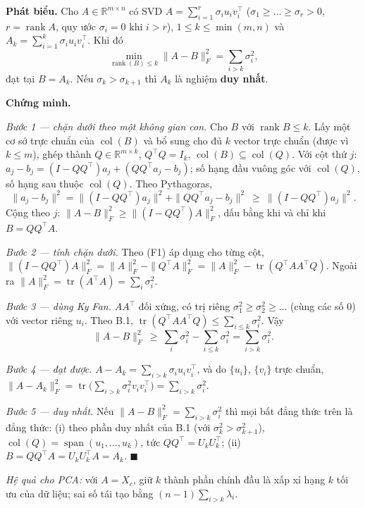 \textbf{Phát biểu.} Cho \(A\in\mathbb R^{m\times n}\) có SVD \(A=\sum_{i=1}^{r}\sigma_iu_iv_i^\top\) (\(\sigma_1\ge\dots\ge\sigma_r>0\), \(r=\operatorname{rank}A\), quy ước \(\sigma_i=0\) khi \(i>r\)), \(1\le k\le\min(m,n)\) và \(A_k=\sum_{i=1}^k\sigma_iu_iv_i^\top\). Khi đó \[\min_{\operatorname{rank}(B)\le k}\|A-B\|_F^2=\sum_{i>k}\sigma_i^2,\] đạt tại \(B=A_k\). Nếu \(\sigma_k>\sigma_{k+1}\) thì \(A_k\) là nghiệm \textbf{duy nhất}.

\textbf{Chứng minh.}

\emph{Bước 1 --- chặn dưới theo một không gian con.} Cho \(B\) với \(\operatorname{rank}B\le k\). Lấy một cơ sở trực chuẩn của \(\operatorname{col}(B)\) và bổ sung cho đủ \(k\) vector trực chuẩn (được vì \(k\le m\)), ghép thành \(Q\in\mathbb R^{m\times k}\), \(Q^\top Q=I_k\), \(\operatorname{col}(B)\subseteq\operatorname{col}(Q)\). Với cột thứ \(j\): \(a_j-b_j=(I-QQ^\top)a_j+(QQ^\top a_j-b_j)\); số hạng đầu vuông góc với \(\operatorname{col}(Q)\), số hạng sau thuộc \(\operatorname{col}(Q)\). Theo Pythagoras, \[\|a_j-b_j\|^2=\|(I-QQ^\top)a_j\|^2+\|QQ^\top a_j-b_j\|^2\ \ge\ \|(I-QQ^\top)a_j\|^2 .\] Cộng theo \(j\): \(\|A-B\|_F^2\ge\|(I-QQ^\top)A\|_F^2\), dấu bằng khi và chỉ khi \(B=QQ^\top A\).

\emph{Bước 2 --- tính chặn dưới.} Theo (F1) áp dụng cho từng cột, \(\|(I-QQ^\top)A\|_F^2=\|A\|_F^2-\|Q^\top A\|_F^2=\|A\|_F^2-\operatorname{tr}(Q^\top AA^\top Q)\). Ngoài ra \(\|A\|_F^2=\operatorname{tr}(A^\top A)=\sum_i\sigma_i^2\).

\emph{Bước 3 --- dùng Ky Fan.} \(AA^\top\) đối xứng, có trị riêng \(\sigma_1^2\ge\sigma_2^2\ge\dots\) (cùng các số 0) với vector riêng \(u_i\). Theo B.1, \(\operatorname{tr}(Q^\top AA^\top Q)\le\sum_{i\le k}\sigma_i^2\). Vậy \[\|A-B\|_F^2\ \ge\ \sum_i\sigma_i^2-\sum_{i\le k}\sigma_i^2=\sum_{i>k}\sigma_i^2 .\]

\emph{Bước 4 --- đạt được.} \(A-A_k=\sum_{i>k}\sigma_iu_iv_i^\top\), và do \(\{u_i\}\), \(\{v_i\}\) trực chuẩn, \(\|A-A_k\|_F^2=\operatorname{tr}\big(\sum_{i>k}\sigma_i^2v_iv_i^\top\big)=\sum_{i>k}\sigma_i^2\).

\emph{Bước 5 --- duy nhất.} Nếu \(\|A-B\|_F^2=\sum_{i>k}\sigma_i^2\) thì mọi bất đẳng thức trên là đẳng thức: (i) theo phần duy nhất của B.1 (với \(\sigma_k^2>\sigma_{k+1}^2\)), \(\operatorname{col}(Q)=\operatorname{span}(u_1,\dots,u_k)\), tức \(QQ^\top=U_kU_k^\top\); (ii) \(B=QQ^\top A=U_kU_k^\top A=A_k\). \(\blacksquare\)

\emph{Hệ quả cho PCA:} với \(A=X_c\), giữ \(k\) thành phần chính đầu là xấp xỉ hạng \(k\) tối ưu của dữ liệu; sai số tái tạo bằng \((n-1)\sum_{i>k}\lambda_i\).
